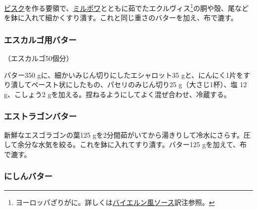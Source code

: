 \begin{recette}
\protect\hyperlink{}{ビスク}を作る要領で、\protect\hyperlink{mirepoix}{ミルポワ}とともに茹でたエクルヴィス\footnote{ヨーロッパざりがに。詳しくは\protect\hyperlink{sauce-bavaroise}{バイエルン風ソース}訳注参照。}の胴や殻、尾などを鉢に入れて細かくすり潰す。これと同じ重さのバターを加え、布で漉す。

\hypertarget{beurre-pour-les-escargots}{%
\subsubsection{エスカルゴ用バター}\label{beurre-pour-les-escargots}}



（エスカルゴ50個分）

バター350 gに、細かいみじん切りにしたエシャロット35
gと、にんにく1片をすり潰してペースト状にしたもの、パセリのみじん切り25
g（大さじ1杯）、塩 12 g、こしょう2
gを加える。捏ねるようにしてよく混ぜ合わせ、冷蔵する。

\hypertarget{beurre-d-estragon}{%
\subsubsection{エストラゴンバター}\label{beurre-d-estragon}}



新鮮なエスゴラゴンの葉125
gを2分間茹がいてから湯きりして冷水にさらす。圧して余分な水気を絞る。これを鉢に入れてすり潰す。バター125
gを加えて、布で漉す。

\hypertarget{beurre-de-hereng}{%
\subsubsection{にしんバター}\label{beurre-de-hereng}}


\end{recette}
